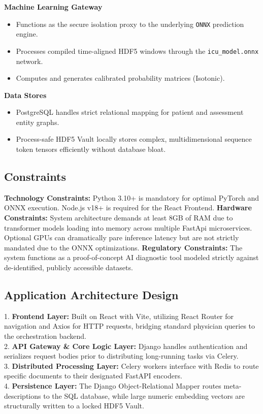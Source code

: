 \documentclass{fisatprojectfinal}
\begin{document}
\textbf{Machine Learning Gateway}
\begin{itemize}
    \item Functions as the secure isolation proxy to the underlying \texttt{ONNX} prediction engine.
    \item Processes compiled time-aligned HDF5 windows through the \texttt{icu\_model.onnx} network.
    \item Computes and generates calibrated probability matrices (Isotonic).
\end{itemize}

\textbf{Data Stores}
\begin{itemize}
    \item PostgreSQL handles strict relational mapping for patient and assessment entity graphs.
    \item Process-safe HDF5 Vault locally stores complex, multidimensional sequence token tensors efficiently without database bloat.
\end{itemize}

\subsection{Constraints}
\textbf{Technology Constraints:}
Python 3.10+ is mandatory for optimal PyTorch and ONNX execution. Node.js v18+ is required for the React Frontend.
\textbf{Hardware Constraints:}
System architecture demands at least 8GB of RAM due to transformer models loading into memory across multiple FastApi microservices. Optional GPUs can dramatically pare inference latency but are not strictly mandated due to the ONNX optimizations.
\textbf{Regulatory Constraints:}
The system functions as a proof-of-concept AI diagnostic tool modeled strictly against de-identified, publicly accessible datasets.

\subsection{Application Architecture Design}
1. \textbf{Frontend Layer:} Built on React with Vite, utilizing React Router for navigation and Axios for HTTP requests, bridging standard physician queries to the orchestration backend. \\
2. \textbf{API Gateway \& Core Logic Layer:} Django handles authentication and serializes request bodies prior to distributing long-running tasks via Celery. \\
3. \textbf{Distributed Processing Layer:} Celery workers interface with Redis to route specific documents to their designated FastAPI encoders.  \\
4. \textbf{Persistence Layer:} The Django Object-Relational Mapper routes meta-descriptions to the SQL database, while large numeric embedding vectors are structurally written to a locked HDF5 Vault.
\end{document}

